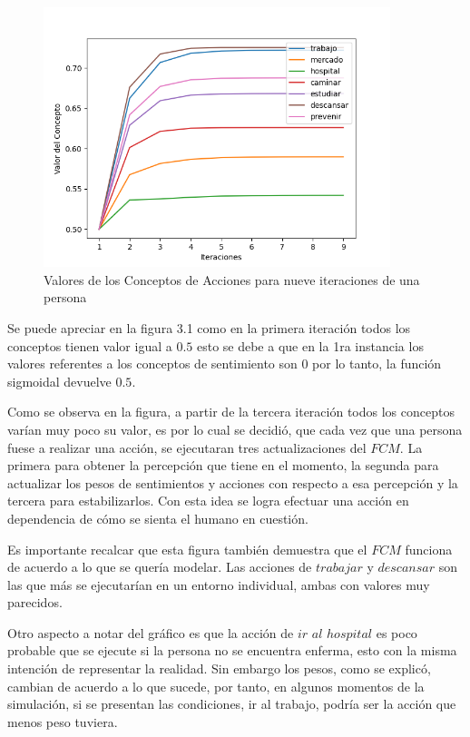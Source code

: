 \begin{figure}[htb]
    \centering
    \includegraphics[width=0.9\textwidth]{Graphics/Conceptos_Valores_Normales.png}
    \caption{Valores de los Conceptos de Acciones para nueve iteraciones de una persona}
\end{figure}

Se puede apreciar en la figura 3.1 como en la primera iteración todos los conceptos tienen valor
igual a $0.5$ esto se debe a que en la 1ra instancia los valores referentes a los conceptos
de sentimiento son $0$ por lo tanto, la función sigmoidal devuelve $0.5$.

Como se observa en la figura, a partir de la tercera iteración todos los conceptos varían 
muy poco su valor, es por lo cual se decidió, que cada vez que una persona fuese a realizar
una acción, se ejecutaran tres actualizaciones del $FCM$. La primera para obtener la percepción
que tiene en el momento, la segunda para actualizar los pesos de sentimientos y acciones con
respecto a esa percepción y la tercera para estabilizarlos. Con esta idea
se logra efectuar una acción en dependencia de cómo se sienta el humano en cuestión.

Es importante recalcar que esta figura también demuestra que el $FCM$ funciona de acuerdo a lo 
que se quería modelar. Las acciones de $trabajar$ y $descansar$ son las que más se ejecutarían
en un entorno individual, ambas con valores muy parecidos.

Otro aspecto a notar del gráfico es que la acción de $ir$ $al$ $hospital$ es poco probable que 
se ejecute si la persona no se encuentra enferma, esto con la misma intención de representar la 
realidad. Sin embargo los pesos, como se explicó, cambian de acuerdo a lo que sucede, por tanto,
en algunos momentos de la simulación, si se presentan las condiciones, ir al trabajo,
podría ser la acción que menos peso tuviera.

